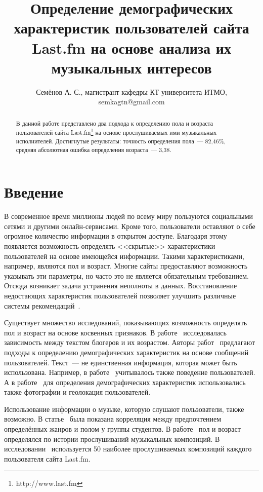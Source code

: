\documentclass{spisok-article}
\title{Определение демографических характеристик пользователей
  сайта Last.fm на основе анализа их музыкальных интересов
}
\author{Семёнов А. С., магистрант кафедры КТ университета ИТМО,
  semkagtn@gmail.com
}
\newcommand{\bestGender}{82,46\%}
\newcommand{\bestAge}{3,38}
\begin{document}
\maketitle

\begin{abstract}
В данной работе представлено два подхода к определению пола и
возраста пользователей сайта Last.fm\footnote{http://www.last.fm}
на основе прослушиваемых ими музыкальных исполнителей.
Достигнутые результаты: точность определения пола~--- \bestGender,
средняя абсолютная ошибка определения возраста~--- \bestAge.
\end{abstract}


\section{Введение}

В современное время миллионы людей по всему миру пользуются
социальными сетями и другими онлайн-сервисами. Кроме того,
пользователи оставляют о себе огромное количество информации
в открытом доступе. Благодаря этому появляется возможность
определять <<скрытые>> характеристики пользователей на основе
имеющейся информации. Такими характеристиками, например, 
являются пол и возраст. Многие сайты предоставляют возможность 
указывать эти параметры, но часто это не является обязательным
требованием. Отсюда возникает задача устранения неполноты в 
данных. Восстановление недостающих характеристик пользователей 
позволяет улучшить различные системы
рекомендаций~\cite{recommender2001,recommender2005}.

Существует множество исследований, показывающих возможность 
определять пол и возраст на основе косвенных признаков.
В работе~\cite{burger2006} исследовалась зависимость 
между текстом блогеров и их возрастом.
Авторы работ~\cite{peersman2011,turdakov2013,schwartz2013} 
предлагают подходы к определению демографических характеристик 
на основе сообщений пользователей. Текст~--- не единственная
информация, которая может быть использована. Например, в
работе~\cite{rosenthal2011} учитывалось также
поведение пользователей. А в работе~\cite{farseev2015}
для определения демографических характеристик использовались
также фотографии и геолокация пользователей.

Использование информации о музыке, которую слушают пользователи, 
также возможно. В статье~\cite{christenson1988} была показана
корреляция между предпочтением определённых жанров и полом у
группы студентов. В работе~\cite{liu2012} пол и возраст определялся
по истории прослушиваний музыкальных композиций.
В исследовании~\cite{wu2014} используется 50 наиболее
прослушиваемых композиций каждого пользователя сайта Last.fm.
\end{document}

